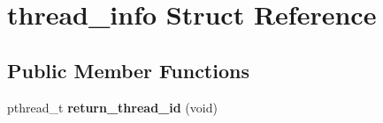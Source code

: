 \hypertarget{structthread__info}{\section{thread\-\_\-info Struct Reference}
\label{structthread__info}
}
\subsection*{Public Member Functions}
\begin{DoxyCompactItemize}
\item 
\hypertarget{structthread__info_aeed0a3f0a5c22f4b19f0160676768124}{pthread\-\_\-t {\bfseries return\-\_\-thread\-\_\-id} (void)}\label{structthread__info_aeed0a3f0a5c22f4b19f0160676768124}

\end{DoxyCompactItemize}
